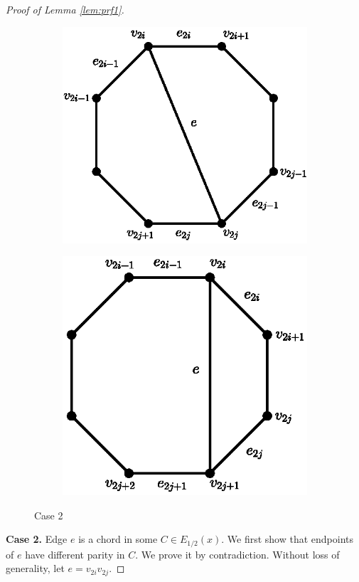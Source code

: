 \documentclass[11pt]{article}
\numberwithin{theorem}{section}
\begin{document}
\begin{proof}[Proof of Lemma \ref{lem:prf1}]
\begin{figure}
\centering
\begin{subfigure}{.4\textwidth}
  \centering
  \includegraphics[width=.85\linewidth]{KernelMengerian-fig1a}
  \caption{}
  \label{fig1a}
\end{subfigure}%
\begin{subfigure}{.4\textwidth}
  \centering
  \includegraphics[width=.845\linewidth]{KernelMengerian-fig1b}
  \caption{}
  \label{fig1b}
\end{subfigure}
\caption{Case 2}
\end{figure}
\textbf{Case 2.} Edge $e$ is a chord in some $C\in E_{1/2}(x)$. We first show that endpoints of $e$ have different parity in $C$. We prove it by contradiction. Without loss of generality, let $e=v_{2i}v_{2j}$.


\end{proof}
\end{document}
